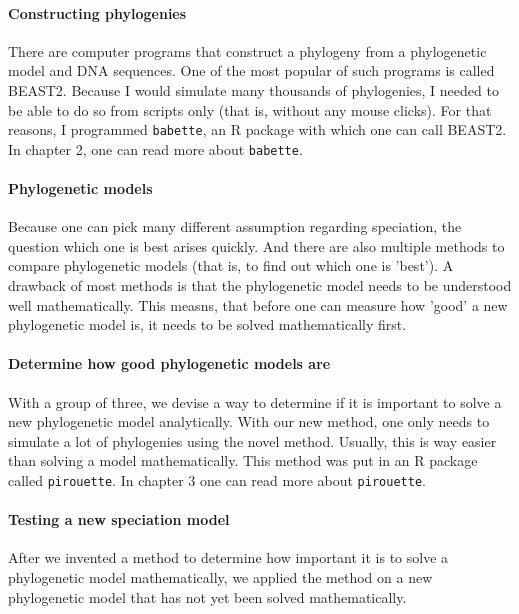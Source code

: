\paragraph{Constructing phylogenies}

There are computer programs that construct a phylogeny from a
phylogenetic model and DNA sequences.
One of the most popular of such programs is called BEAST2.
Because I would simulate many thousands of phylogenies,
I needed to be able to do so from scripts only (that is,
without any mouse clicks). For that reasons, I programmed
\verb;babette;, an R package with which one can call BEAST2.
In chapter 2, one can read more about \verb;babette;.

\paragraph{Phylogenetic models}

Because one can pick many different assumption regarding speciation,
the question which one is best arises quickly.
And there are also multiple methods to compare 
phylogenetic models (that is, to find out which one is 'best').
A drawback of most methods is that the phylogenetic model
needs to be understood well mathematically.
This measns, that before one can measure how 'good' a new
phylogenetic model is, it needs to be solved mathematically first.

\paragraph{Determine how good phylogenetic models are}

With a group of three, we devise a way to determine if
it is important to solve a new phylogenetic model analytically.
With our new method, one only needs to simulate a lot
of phylogenies using the novel method.
Usually, this is way easier than solving a model mathematically.
This method was put in an R package called \verb;pirouette;. 
In chapter 3 one can read more about \verb;pirouette;.

\paragraph{Testing a new speciation model}

After we invented a method to determine how important it is
to solve a phylogenetic model mathematically, we applied
the method on a new phylogenetic model that has not yet been
solved mathematically.

